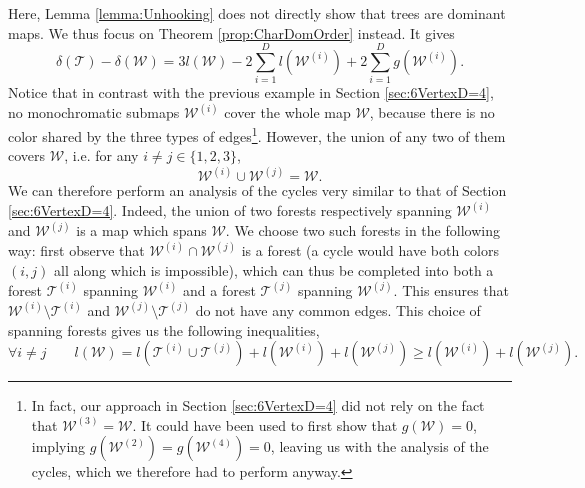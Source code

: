 \documentclass[aps,prd,10pt,notitlepage,nofootinbib,superscriptaddress,showkeys,showpacs]{revtex4-1}
\begin{document}
Here, Lemma \ref{lemma:Unhooking} does not directly show that trees are dominant maps. We thus focus on Theorem \ref{prop:CharDomOrder} instead. It gives
\begin{equation}
\delta({\mathcal{T}})-\delta({\mathcal{W}})=3l({\mathcal{W}})-2\sum_{i=1}^D l({\mathcal{W}}^{(i)})+2\sum_{i=1}^D g({\mathcal{W}}^{(i)}).
\end{equation}
Notice that in contrast with the previous example in Section \ref{sec:6VertexD=4}, no monochromatic submaps ${\mathcal{W}}^{(i)}$ cover the whole map ${\mathcal{W}}$, because there is no color shared by the three types of edges\footnote{In fact, our approach in Section \ref{sec:6VertexD=4} did not rely on the fact that ${\mathcal{W}}^{(3)} = {\mathcal{W}}$. It could have been used to first show that $g({\mathcal{W}}) = 0$, implying $g({\mathcal{W}}^{(2)}) = g({\mathcal{W}}^{(4)}) = 0$, leaving us with the analysis of the cycles, which we therefore had to perform anyway.}. However, the union of any two of them covers ${\mathcal{W}}$, i.e. for any $i\neq j \in\{1,2,3\}$,
\begin{equation}
{\mathcal{W}}^{(i)}\cup{\mathcal{W}}^{(j)}={\mathcal{W}}.
\end{equation}
We can therefore perform an analysis of the cycles very similar to that of Section \ref{sec:6VertexD=4}. Indeed, the union of two forests respectively spanning ${\mathcal{W}}^{(i)}$ and ${\mathcal{W}}^{(j)}$ is a map which spans ${\mathcal{W}}$. We choose two such forests in the following way: first observe that ${\mathcal{W}}^{(i)}\cap{\mathcal{W}}^{(j)}$ is a forest (a cycle would have both colors $(i, j)$ all along which is impossible), which can thus be completed into both a forest ${\mathcal{T}}^{(i)}$ spanning ${\mathcal{W}}^{(i)}$ and a forest ${\mathcal{T}}^{(j)}$ spanning ${\mathcal{W}}^{(j)}$. This ensures that ${\mathcal{W}}^{(i)}\setminus{\mathcal{T}}^{(i)}$ and ${\mathcal{W}}^{(j)}\setminus{\mathcal{T}}^{(j)}$ do not have any common edges. This choice of spanning forests gives us the following inequalities,
\begin{equation}
\label{LiLj}
\forall i\neq j \qquad l({\mathcal{W}})=l({\mathcal{T}}^{(i)}\cup{\mathcal{T}}^{(j)})+l({\mathcal{W}}^{(i)})+l({\mathcal{W}}^{(j)})\geq l({\mathcal{W}}^{(i)})+l({\mathcal{W}}^{(j)}).
\end{equation}
\end{document}
